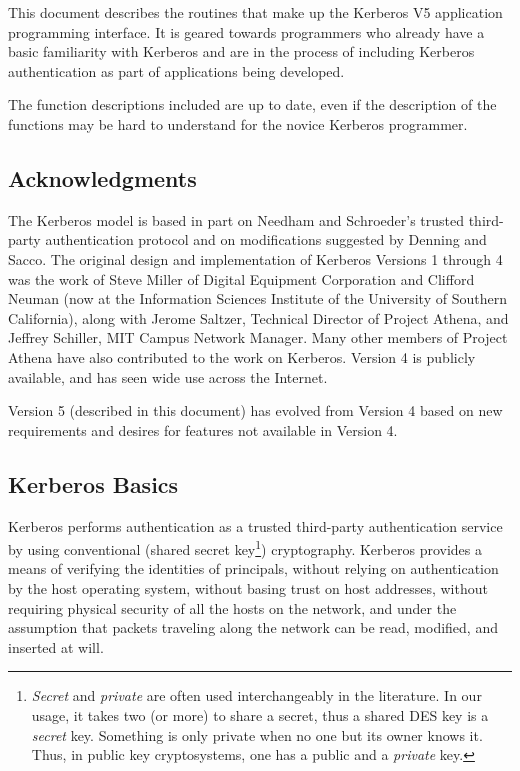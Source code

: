 	This document describes the routines that make up the Kerberos
V5 application programming interface.  It is geared towards
programmers who already have a basic familiarity with Kerberos and are
in the process of including Kerberos authentication as part of 
applications being developed.

	The function descriptions included are up to date, even if the
description of the functions may be hard to understand for the novice
Kerberos programmer.

\subsection{Acknowledgments}


The Kerberos model is based in part on Needham and Schroeder's trusted
third-party authentication protocol and on modifications suggested by
Denning and Sacco.  The original design and implementation of Kerberos
Versions 1 through 4 was the work of Steve Miller of Digital Equipment
Corporation and Clifford Neuman (now at the Information Sciences
Institute of the University of Southern California), along with Jerome
Saltzer, Technical Director of Project Athena, and Jeffrey Schiller,
MIT Campus Network Manager.  Many other members of Project Athena have
also contributed to the work on Kerberos.  Version 4 is publicly
available, and has seen wide use across the Internet.

Version 5 (described in this document) has evolved from Version 4 based
on new requirements and desires for features not available in Version 4.


\subsection{Kerberos Basics}

Kerberos performs authentication as a trusted third-party
authentication service by using conventional (shared secret
key\footnote{ {\em Secret} and {\em private} are often used
interchangeably in the literature.  In our usage, it takes two (or
more) to share a secret, thus a shared DES key is a {\em secret} key.
Something is only private when no one but its owner knows it.  Thus,
in public key cryptosystems, one has a public and a {\em private} key.
}) cryptography.  Kerberos provides a means of verifying the
identities of principals, without relying on authentication by the
host operating system, without basing trust on host addresses, without
requiring physical security of all the hosts on the network, and under
the assumption that packets traveling along the network can be read,
modified, and inserted at will.

